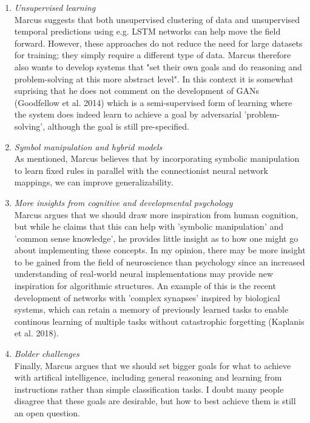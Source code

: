 \documentclass{article}
\begin{document}
\begin{enumerate}[1]
\item \textit{Unsupervised learning}\\
Marcus suggests that both unsupervised clustering of data and unsupervised temporal predictions using e.g. LSTM networks can help move the field forward. However, these approaches do not reduce the need for large datasets for training; they simply require a different type of data. Marcus therefore also wants to develop systems that "set their own goals and do reasoning and problem-solving at this more abstract level".
In this context it is somewhat suprising that he does not comment on the development of GANs (Goodfellow et al. 2014) which is a semi-supervised form of learning where the system does indeed learn to achieve a goal by adversarial 'problem-solving', although the goal is still pre-specified.

\item \textit{Symbol manipulation and hybrid models}\\
As mentioned, Marcus believes that by incorporating symbolic manipulation to learn fixed rules in parallel with the connectionist neural network mappings, we can improve generalizability.

\item \textit{More insights from cognitive and developmental psychology}\\
Marcus argues that we should draw more inspiration from human cognition, but while he claims that this can help with 'symbolic manipulation' and 'common sense knowledge', he provides little insight as to how one might go about implementing these concepts. In my opinion, there may be more insight to be gained from the field of neuroscience than psychology since an increased understanding of real-world neural implementations may provide new inspiration for algorithmic structures. An example of this is the recent development of networks with 'complex synapses' inspired by biological systems, which can retain a memory of previously learned tasks to enable continous learning of multiple tasks without catastrophic forgetting (Kaplanis et al. 2018).

\item \textit{Bolder challenges}\\
Finally, Marcus argues that we should set bigger goals for what to achieve with artifical intelligence, including general reasoning and learning from instructions rather than simple classification tasks. I doubt many people disagree that these goals are desirable, but how to best achieve them is still an open question.
\end{enumerate}
\end{document}
